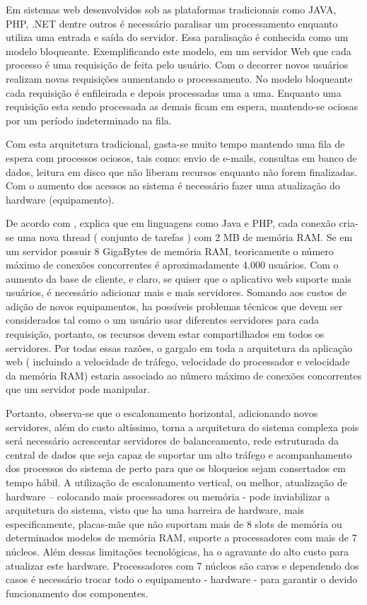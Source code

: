   Em sistemas web desenvolvidos sob as plataformas tradicionais como JAVA, \ac{PHP}, .NET dentre outros 
  é necessário paralisar um processamento enquanto utiliza uma entrada e saída do servidor. 
  Essa paralisação é conhecida como um modelo bloqueante. Exemplificando este modelo, em um servidor Web 
  que cada processo é uma requisição de feita pelo usuário. Com o decorrer novos usuários realizam novas 
  requisições aumentando o processamento. No modelo bloqueante cada requisição é enfileirada e depois 
  processadas uma a uma. Enquanto uma requisição esta sendo processada as demais ficam em espera, 
  mantendo-se ociosas por um período indeterminado na fila.\cite{Pereira:2013}
  
  Com esta arquitetura tradicional, gasta-se muito tempo mantendo uma fila de espera com processos ociosos,
  tais como: envio de e-mails, consultas em banco de dados, leitura em disco que não liberam recursos enquanto
  não forem finalizadas. Com o aumento dos acessos ao sistema é necessário fazer uma atualização
  do hardware (equipamento).\cite{Pereira:2013}
  
  De acordo com , explica que em linguagens como Java e \ac{PHP}, cada conexão cria-se uma 
  nova thread ( conjunto de tarefas ) com 2 MB de memória RAM. Se em um servidor possuir 8 GigaBytes de memória RAM, 
  teoricamente o número máximo de conexões concorrentes é aproximadamente 4.000 usuários. 
  Com o aumento da base de cliente, e claro, se quiser que o aplicativo web suporte mais usuários, é necessário 
  adicionar mais e mais servidores. Somando aos custos de adição de novos equipamentos, ha possíveis problemas 
  técnicos que devem ser considerados tal como o um usuário usar diferentes servidores para cada requisição, portanto, 
  os recursos devem estar compartilhados em todos os servidores. Por todas essas razões, o gargalo em toda a arquitetura 
  da aplicação web ( incluindo a velocidade de tráfego, velocidade do processador e velocidade da memória RAM) 
  estaria associado ao número máximo de conexões concorrentes que um servidor pode manipular.
  
  Portanto, observa-se que o escalonamento horizontal, adicionando novos servidores, além do custo altíssimo, 
  torna a arquitetura do sistema complexa pois será necessário acrescentar servidores de balanceamento, 
  rede estruturada da central de dados que seja capaz de suportar um alto tráfego e acompanhamento dos processos 
  do sistema de perto para que os bloqueios sejam consertados em tempo hábil. A utilização de escalonamento vertical, 
  ou melhor, atualização de hardware – colocando mais processadores ou memória - pode inviabilizar a arquitetura do 
  sistema, visto que ha uma barreira de hardware, mais especificamente, placas-mãe que não suportam mais de 8 slots 
  de memória ou determinados modelos de memória RAM, suporte a processadores com mais de 7 núcleos. 
  Além dessas limitações tecnológicas, ha o agravante do alto custo para atualizar este hardware. 
  Processadores com 7 núcleos são caros e dependendo dos casos é necessário trocar todo o equipamento - hardware - 
  para garantir o devido funcionamento dos componentes.
  
